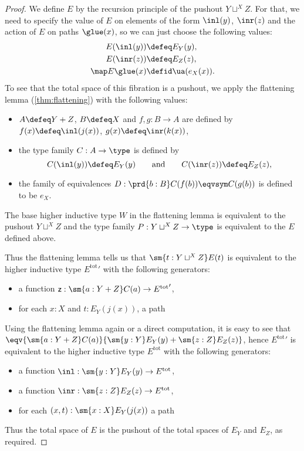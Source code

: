 {\begin{proof}
  We define $E$ by the recursion principle of the pushout $Y\sqcup^XZ$. For
  that, we need to specify the value of $E$ on elements of the form $\inl(y)$, $\inr(z)$
  and the action of $E$ on paths $\glue(x)$, so we can just choose the following
  values:
  \begin{align*}
    E(\inl(y)) & \defeq E_Y(y),\\
    E(\inr(z)) & \defeq E_Z(z),\\
    \map E{\glue(x)} & \defid \ua(e_X(x)).
  \end{align*}
  To see that the total space of this fibration is a pushout, we apply the
  flattening lemma (\cref{thm:flattening}) with the following values:
  \begin{itemize}
  \item $A\defeq Y+Z$, $B\defeq X$ and $f,g:B\to A$ are defined by
    $f(x)\defeq\inl(j(x))$, $g(x)\defeq\inr(k(x))$,
  \item the type family $C:A\to\type$ is defined by
    \begin{equation*}
      C(\inl(y)) \defeq E_Y(y)
      \qquad\text{and}\qquad
      C(\inr(z)) \defeq E_Z(z),
    \end{equation*}
  \item the family of equivalences $D:\prd{b:B}C(f(b))\eqvsym C(g(b))$ is defined
    to be $e_X$.
  \end{itemize}
  The base higher inductive type $W$ in the flattening lemma is equivalent to
  the pushout $Y\sqcup^XZ$ and the type family $P:Y\sqcup^XZ\to\type$ is
  equivalent to the $E$ defined above.

  Thus the flattening lemma tells us that $\sm{t:Y\sqcup^XZ}E(t)$ is equivalent
  to the higher inductive type ${E^{\mathrm{tot}}}'$ with the following generators:
  \begin{itemize}
  \item a function $\mathsf{z}:\sm{a:Y+Z}C(a)\to {E^{\mathrm{tot}}}'$,
  \item for each $x:X$ and $t:E_Y(j(x))$, a path
  \end{itemize}
  Using the flattening lemma again or a direct computation, it is easy to see
  that $\eqv{\sm{a:Y+Z}C(a)}{\sm{y:Y}E_Y(y)+\sm{z:Z}E_Z(z)}$, hence
  ${E^{\mathrm{tot}}}'$ is equivalent to the higher inductive type
  $E^{\mathrm{tot}}$ with the following generators:
  \begin{itemize}
  \item a function $\inl:\sm{y:Y}E_Y(y)\to E^{\mathrm{tot}}$,
  \item a function $\inr:\sm{z:Z}E_Z(z)\to E^{\mathrm{tot}}$,
  \item for each $(x,t):\sm{x:X}E_Y(j(x))$ a path
  \end{itemize}
  Thus the total space of $E$ is the pushout of the total spaces of
  $E_Y$ and $E_Z$, as required.
\end{proof}

}
